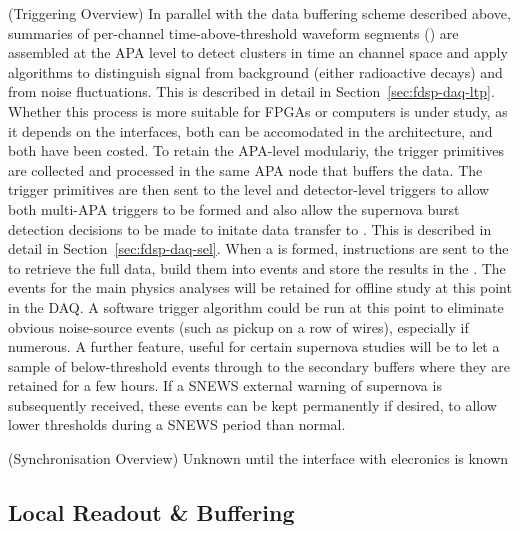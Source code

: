 (Triggering Overview) In parallel with the data buffering scheme
described above, summaries of per-channel time-above-threshold
waveform segments () are assembled at the APA
level to detect clusters in time an channel space and apply algorithms
to distinguish signal from background (either radioactive decays) and
from noise fluctuations. This is described in detail in
Section~\ref{sec:fdsp-daq-ltp}.
Whether this process is more suitable for FPGAs or computers is under
study, as it depends on the interfaces, both can be accomodated in the
architecture, and both have been costed. 
To retain the APA-level modulariy, the trigger primitives are
collected and processed in the same APA node that buffers the data.
The trigger primitives are then sent to the  level and 
detector-level triggers to allow both multi-APA triggers to be formed
and also allow the supernova burst detection decisions to be made to
initate data transfer to . 
This is described in detail in Section~\ref{sec:fdsp-daq-sel}.
When a  is formed, instructions are sent to the
 to retrieve the full data, build them into events
and store the results in the .
The events for the main physics analyses will be retained for offline
study at this point in the DAQ. 
A software trigger algorithm could be run at this point to eliminate
obvious noise-source events (such as pickup on a row of wires),
especially if numerous. 
A further feature, useful for certain supernova studies will be to let
a sample of below-threshold events through to the secondary buffers
where they are retained for a few hours. 
If a SNEWS external warning of supernova is subsequently received,
these events can be kept permanently if desired, to allow lower
thresholds during a SNEWS period than normal.

(Synchronisation Overview) Unknown until the interface with elecronics is known

\subsection{Local Readout \& Buffering}
\label{sec:fdsp-daq-ltr}


